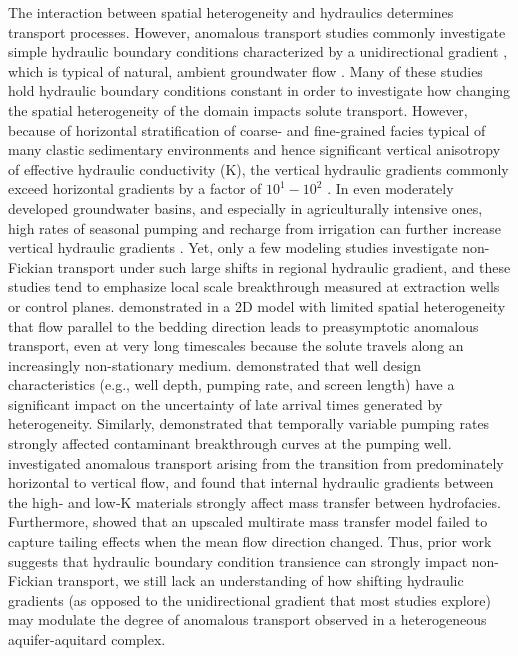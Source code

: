 The interaction between spatial heterogeneity and hydraulics determines transport processes. However, anomalous transport studies commonly investigate simple hydraulic boundary conditions characterized by a unidirectional gradient \citep{benson2001fractional, edery2014origins, edery2016structural, harvey2000rate, pedretti2014apparent, willmann2008transport, leblanc1991large, julian2001numerical, Zhang1999nonideal, henri2015random}, which is typical of natural, ambient groundwater flow \citep[e.g. a horizontal hydraulic gradient on the order of $10^{-3}$][]{Fetter2001}. Many of these studies hold hydraulic boundary conditions constant in order to investigate how changing the spatial heterogeneity of the domain impacts solute transport. However, because of horizontal stratification of coarse- and fine-grained facies typical of many clastic sedimentary environments and hence significant vertical anisotropy of effective hydraulic conductivity (K), the vertical hydraulic gradients commonly exceed horizontal gradients by a factor of $10^1 - 10^2$ \citep[e.g.][]{fogg1986groundwater, belitz1993numerical}. In even moderately developed groundwater basins, and especially in agriculturally intensive ones, high rates of seasonal pumping and recharge from irrigation can further increase vertical hydraulic gradients \citep{styles1999subsurface, gailey2018using}. Yet, only a few modeling studies investigate non-Fickian transport under such large shifts in regional hydraulic gradient, and these studies tend to emphasize local scale breakthrough measured at extraction wells or control planes. \citet{matheron1980transport} demonstrated in a 2D model with limited spatial heterogeneity that flow parallel to the bedding direction leads to preasymptotic anomalous transport, even at very long timescales because the solute travels along an increasingly non-stationary medium. \citet{henri2019stochastic} demonstrated that well design characteristics (e.g., well depth, pumping rate, and screen length) have a significant impact on the uncertainty of late arrival times generated by heterogeneity. Similarly, \citet{libera2017influence} demonstrated that temporally variable pumping rates strongly affected contaminant breakthrough curves at the pumping well. \citet{guo2019upscaling} investigated anomalous transport arising from the transition from predominately horizontal to vertical flow, and found that internal hydraulic gradients between the high‐ and low‐K materials strongly affect mass transfer between hydrofacies. Furthermore, \citep{guo2020adaptive} showed that an upscaled multirate mass transfer model failed to capture tailing effects when the mean flow direction changed. Thus, prior work suggests that hydraulic boundary condition transience can strongly impact non-Fickian transport, we still lack an understanding of how shifting hydraulic gradients (as opposed to the unidirectional gradient that most studies explore) may modulate the degree of anomalous transport observed in a heterogeneous aquifer-aquitard complex. 

